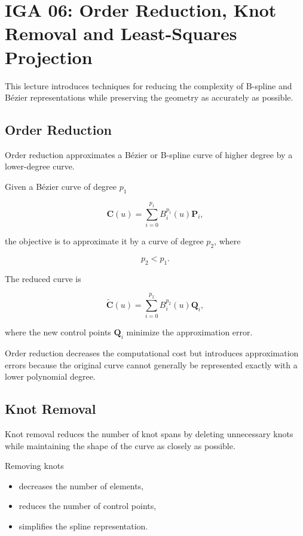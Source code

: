\documentclass[dvipdfmx,11pt,a4paper,uplatex]{jsarticle}
\title{}
\author{}
\begin{document}
\maketitle
\section{IGA 06: Order Reduction, Knot Removal and Least-Squares Projection}

This lecture introduces techniques for reducing the complexity of B-spline and Bézier representations while preserving the geometry as accurately as possible.

\subsection{Order Reduction}

Order reduction approximates a Bézier or B-spline curve of higher degree by a lower-degree curve.

Given a Bézier curve of degree $p_1$

\[
\mathbf{C}(u)=\sum_{i=0}^{p_1} B_i^{p_1}(u)\mathbf{P}_i,
\]

the objective is to approximate it by a curve of degree $p_2$, where

\[
p_2 < p_1.
\]

The reduced curve is

\[
\tilde{\mathbf{C}}(u)=
\sum_{i=0}^{p_2}
B_i^{p_2}(u)\mathbf{Q}_i,
\]

where the new control points $\mathbf{Q}_i$ minimize the approximation error.

Order reduction decreases the computational cost but introduces approximation errors because the original curve cannot generally be represented exactly with a lower polynomial degree.

\bigskip

\subsection{Knot Removal}

Knot removal reduces the number of knot spans by deleting unnecessary knots while maintaining the shape of the curve as closely as possible.

Removing knots

\begin{itemize}
\item decreases the number of elements,
\item reduces the number of control points,
\item simplifies the spline representation.
\end{itemize}
\end{document}
